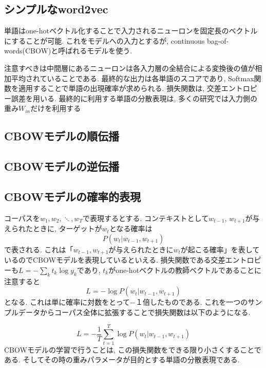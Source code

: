 \documentclass[twocolumn]{jarticle}
\begin{document}
\subsection{シンプルなword2vec}
単語はone-hotベクトル化することで入力されるニューロンを固定長のベクトルにすることが可能. これをモデルへの入力とするが, continuous bag-of-words(CBOW)と呼ばれるモデルを使う.


注意すべきは中間層にあるニューロンは各入力層の全結合による変換後の値が相加平均されていることである. 最終的な出力は各単語のスコアであり, Softmax関数を適用することで単語の出現確率が求められる. 損失関数は, 交差エントロピー誤差を用いる.
最終的に利用する単語の分散表現は, 多くの研究では入力側の重み${W_{in}}$だけを利用する

\subsection{CBOWモデルの順伝播}

\subsection{CBOWモデルの逆伝播}

\subsection{CBOWモデルの確率的表現}
コーパスを${w_1, w_2, \ddots, w_T}$で表現するとする. コンテキストとして${w_{t-1}}$, ${w_{t+1}}$が与えられたときに, ターゲットが${w_t}$となる確率は
\begin{equation}
  P(w_t|w_{t-1}, w_{t+1})
\end{equation}
で表される. これは「${w_{t-1}, w_{t+1}}$が与えられたときに${w_t}$が起こる確率」を表しているのでCBOWモデルを表現しているといえる. 損失関数である交差エントロピーも${L = - \sum_{k} t_k \log y_k }$であり, ${t_k}$がone-hotベクトルの教師ベクトルであることに注意すると
\begin{equation}
  L = - \log P(w_t|w_{t-1}, w_{t+1})
\end{equation}
となる. これは単に確率に対数をとって−１倍したものである. これを一つのサンプルデータからコーパス全体に拡張することで損失関数は以下のようになる.

\begin{equation}
  L = - \frac{1}{T} \sum^{T}_{t=1} \log P(w_t|w_{t-1}, w_{t+1})
\end{equation}
CBOWモデルの学習で行うことは, この損失関数をできる限り小さくすることである. そしてその時の重みパラメータが目的とする単語の分散表現である.
\end{document}
